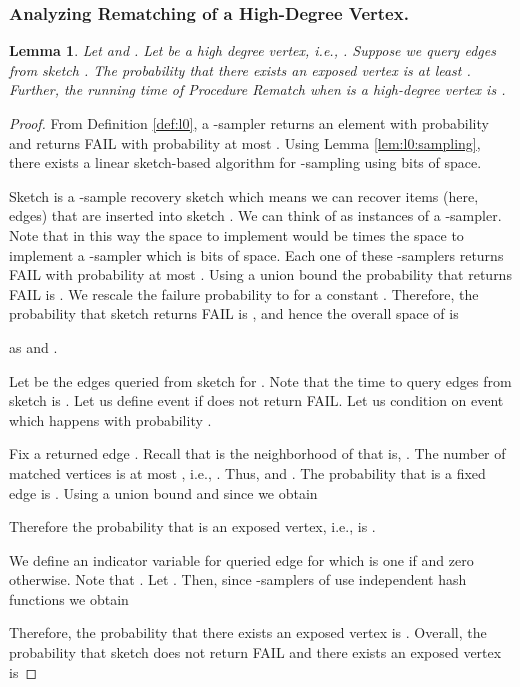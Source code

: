 \documentclass[11pt,letter]{article}
\newtheorem{lemma}[theorem]{Lemma}
\begin{document}
\subsubsection{Analyzing Rematching of a High-Degree Vertex.}

\begin{lemma}
\label{lem:high:rematch}
Let  and .
Let  be a high degree vertex, i.e., .
Suppose we query edges  from sketch .
The probability that there exists an exposed vertex  is
at least .
Further, the running time of Procedure {\sf Rematch}
when  is a high-degree vertex is .
\end{lemma}

\begin{proof}
From Definition \ref{def:l0}, a -sampler returns an element 
with probability  and returns FAIL with
probability at most . Using Lemma \ref{lem:l0:sampling}, there exists
a linear sketch-based algorithm for -sampling using
 bits of space.

Sketch  is a -sample recovery sketch which means
we can recover  items (here, edges) that are
inserted into sketch .
We can think of  as  instances of a -sampler.
Note that in this way the space
to implement  would be  times the space to implement a -sampler
which is  bits of space.
Each one of these  -samplers
returns FAIL with probability at most .
Using a union bound the probability that  returns FAIL is
.
We rescale the failure probability  to 
for a constant .
Therefore, the probability that sketch  returns FAIL is
, and hence the overall space of  is

as  and .

Let  be the edges queried from sketch  for .
Note that the time to query  edges from sketch  is
.
Let us define event  if  does not return FAIL.
Let us condition on event  which happens with probability
.

Fix a returned edge .
Recall that  is the neighborhood
of  that is, .
The number of matched vertices is at most ,
i.e., . Thus,  and
.
The probability that  is a fixed edge  is
.
Using a union bound and since  we obtain



Therefore the probability that  is an exposed vertex, i.e., 
is .

We define an indicator variable  for queried edge  for 
which is one if  and zero otherwise.
Note that . Let .
Then, since  -samplers of  use independent hash functions
we obtain



Therefore, the probability that there exists an exposed vertex 
is .
Overall, the probability that sketch 
does not return FAIL and there exists an exposed vertex
 is

\smallskip
{}
\end{proof}
\end{document}
